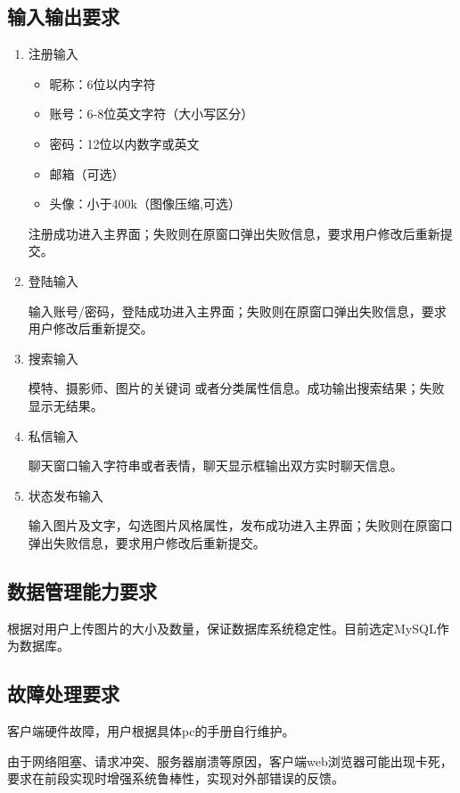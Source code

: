 \documentclass[a4paper,14pt]{ctexart}
\begin{document}
\subsection{输入输出要求}
\begin{enumerate} [1)]
\item 注册输入 \par
\begin{itemize}
\item 昵称：6位以内字符
\item 账号：6-8位英文字符（大小写区分）
\item 密码：12位以内数字或英文
\item 邮箱（可选）
\item 头像：小于400k（图像压缩,可选）

\end{itemize}
注册成功进入主界面；失败则在原窗口弹出失败信息，要求用户修改后重新提交。

\item 登陆输入\par
输入账号/密码，登陆成功进入主界面；失败则在原窗口弹出失败信息，要求用户修改后重新提交。
\item  搜索输入 \par
模特、摄影师、图片的关键词 或者分类属性信息。成功输出搜索结果；失败显示无结果。
\item 私信输入 \par
聊天窗口输入字符串或者表情，聊天显示框输出双方实时聊天信息。
\item  状态发布输入 \par
输入图片及文字，勾选图片风格属性，发布成功进入主界面；失败则在原窗口弹出失败信息，要求用户修改后重新提交。

\end{enumerate}

\subsection{数据管理能力要求}
根据对用户上传图片的大小及数量，保证数据库系统稳定性。目前选定MySQL作为数据库。

\subsection{故障处理要求}
客户端硬件故障，用户根据具体pc的手册自行维护。\par
由于网络阻塞、请求冲突、服务器崩溃等原因，客户端web浏览器可能出现卡死，要求在前段实现时增强系统鲁棒性，实现对外部错误的反馈。 
\end{document}

